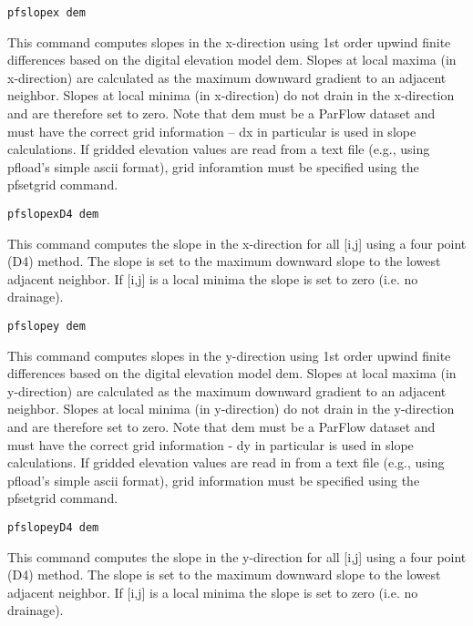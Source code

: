 \begin{description}
\item{\begin{verbatim}pfslopex dem\end{verbatim}}
This command computes slopes in the x-direction using 1st order upwind
finite differences based on the digital elevation model dem. Slopes at local
maxima (in x-direction) are calculated as the maximum downward gradient to
an adjacent neighbor. Slopes at local minima (in x-direction) do not drain in
the x-direction and are therefore set to zero. Note that dem must be a
ParFlow dataset and must have the correct grid information -- dx in particular
is used in slope calculations. If gridded elevation values are read from a text
file (e.g., using pfload's simple ascii format), grid inforamtion must be
specified using the pfsetgrid command.

\item{\begin{verbatim}pfslopexD4 dem\end{verbatim}}
This command computes the slope in the x-direction for all [i,j] using a
four point (D4) method. The slope is set to the maximum downward slope to the
lowest adjacent neighbor. If [i,j] is a local minima the slope is set to zero (i.e. no drainage).


\item{\begin{verbatim}pfslopey dem\end{verbatim}}
This command computes slopes in the y-direction using 1st order upwind
finite differences based on the digital elevation model dem. Slopes at local
maxima (in y-direction) are calculated as the maximum downward gradient to
an adjacent neighbor. Slopes at local minima (in y-direction) do not drain in
the y-direction and are therefore set to zero. Note that dem must be a
ParFlow dataset and must have the correct grid information - dy in particular
is used in slope calculations. If gridded elevation values are read in from a
text file (e.g., using pfload's simple ascii format), grid information must be
specified using the pfsetgrid command.


\item{\begin{verbatim}pfslopeyD4 dem\end{verbatim}}
This command computes the slope in the y-direction for all [i,j] using a four point (D4) method.
The slope is set to the maximum downward slope to the lowest adjacent neighbor. If [i,j] is a local
minima the slope is set to zero (i.e. no drainage).



\end{description}
